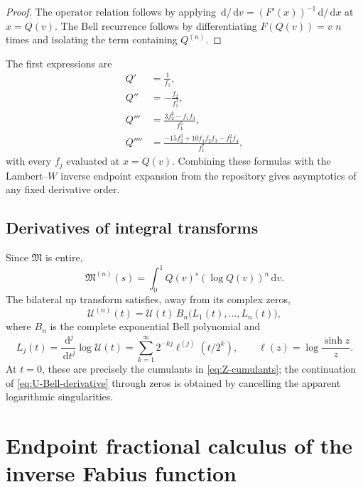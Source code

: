\documentclass[11pt,oneside]{article}
\theoremstyle{definition}
\newcommand{\F}{F}
\newcommand{\Q}{Q}
\newcommand{\M}{\mathfrak M}
\newcommand{\dd}{\,\mathrm d}
\begin{document}
\begin{proof}
The operator relation follows by applying \(\dd/\dd v=(\F'(x))^{-1}\dd/\dd x\) at
\(x=\Q(v)\).  The Bell recurrence follows by differentiating
\(\F(\Q(v))=v\) \(n\) times and isolating the term containing \(\Q^{(n)}\).
\end{proof}

The first expressions are
\begin{align}
 \Q'&=\frac1{f_1},\nonumber\\
 \Q''&=-\frac{f_2}{f_1^3},\nonumber\\
 \Q'''&=\frac{3f_2^2-f_1f_3}{f_1^5},\nonumber\\
 \Q''''&=\frac{-15f_2^3+10f_1f_2f_3-f_1^2f_4}{f_1^7},
 \label{eq:Q-first-derivatives}
\end{align}
with every \(f_j\) evaluated at \(x=\Q(v)\).  Combining these formulas with the
Lambert--\(W\) inverse endpoint expansion from the repository gives asymptotics of any
fixed derivative order.

\subsection{Derivatives of integral transforms}

Since \(\M\) is entire,
\begin{equation}\label{eq:M-nth-derivative}
 \M^{(n)}(s)=\int_0^1\Q(v)^s(\log\Q(v))^n\dd v.
\end{equation}
The bilateral up transform satisfies, away from its complex zeros,
\begin{equation}\label{eq:U-Bell-derivative}
 \mathcal U^{(n)}(t)
 =\mathcal U(t)\,
 B_n\bigl(L_1(t),\ldots,L_n(t)\bigr),
\end{equation}
where \(B_n\) is the complete exponential Bell polynomial and
\begin{equation}\label{eq:Lj-def}
 L_j(t)=\frac{\dd^j}{\dd t^j}\log\mathcal U(t)
 =\sum_{k=1}^{\infty}2^{-kj}
 \ell^{(j)}(t/2^k),
 \qquad \ell(z)=\log\frac{\sinh z}{z}.
\end{equation}
At \(t=0\), these are precisely the cumulants in \cref{eq:Z-cumulants}; the
continuation of \cref{eq:U-Bell-derivative} through zeros is obtained by cancelling the
apparent logarithmic singularities.

\section{Endpoint fractional calculus of the inverse Fabius function}
\label{sec:inverse-fractional-endpoint}
\end{document}
